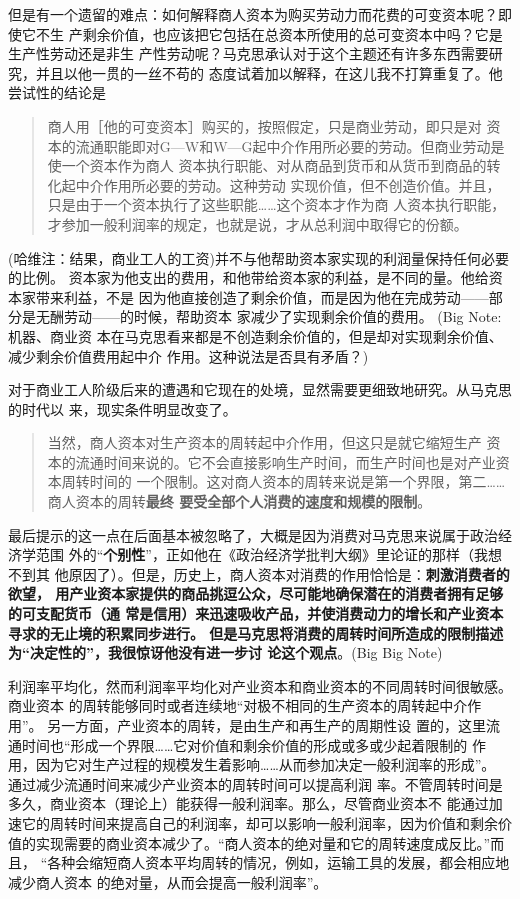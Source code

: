 但是有一个遗留的难点：如何解释商人资本为购买劳动力而花费的可变资本呢？即使它不生
产剩余价值，也应该把它包括在总资本所使用的总可变资本中吗？它是生产性劳动还是非生
产性劳动呢？马克思承认对于这个主题还有许多东西需要研究，并且以他一贯的一丝不苟的
态度试着加以解释，在这儿我不打算重复了。他尝试性的结论是

\begin{quotation}商人用［他的可变资本］购买的，按照假定，只是商业劳动，即只是对
资本的流通职能即对G—W和W—G起中介作用所必要的劳动。但商业劳动是使一个资本作为商人
资本执行职能、对从商品到货币和从货币到商品的转化起中介作用所必要的劳动。这种劳动
实现价值，但不创造价值。并且，只是由于一个资本执行了这些职能……这个资本才作为商
人资本执行职能，才参加一般利润率的规定，也就是说，才从总利润中取得它的份额。
\end{quotation}

(哈维注：结果，商业工人的工资)并不与他帮助资本家实现的利润量保持任何必要的比例。
资本家为他支出的费用，和他带给资本家的利益，是不同的量。他给资本家带来利益，不是
因为他直接创造了剩余价值，而是因为他在完成劳动——部分是无酬劳动——的时候，帮助资本
家减少了实现剩余价值的费用。 (Big Note: 机器、商业资
本在马克思看来都是不创造剩余价值的，但是却对实现剩余价值、减少剩余价值费用起中介
作用。这种说法是否具有矛盾？)

对于商业工人阶级后来的遭遇和它现在的处境，显然需要更细致地研究。从马克思的时代以
来，现实条件明显改变了。

\begin{quotation}当然，商人资本对生产资本的周转起中介作用，但这只是就它缩短生产
资本的流通时间来说的。它不会直接影响生产时间，而生产时间也是对产业资本周转时间的
一个限制。这对商人资本的周转来说是第一个界限，第二……商人资本的周转\textbf{最终
要受全部个人消费的速度和规模的限制}。
\end{quotation}

最后提示的这一点在后面基本被忽略了，大概是因为消费对马克思来说属于政治经济学范围
外的“\textbf{个别性}”，正如他在《政治经济学批判大纲》里论证的那样（我想不到其
他原因了）。但是，历史上，商人资本对消费的作用恰恰是：\textbf{刺激消费者的欲望，
用产业资本家提供的商品挑逗公众，尽可能地确保潜在的消费者拥有足够的可支配货币（通
常是信用）来迅速吸收产品，并使消费动力的增长和产业资本寻求的无止境的积累同步进行。
但是马克思将消费的周转时间所造成的限制描述为“决定性的”，我很惊讶他没有进一步讨
论这个观点}。(Big Big Note)

利润率平均化，然而利润率平均化对产业资本和商业资本的不同周转时间很敏感。商业资本
的周转能够同时或者连续地“对极不相同的生产资本的周转起中介作用”。
 另一方面，产业资本的周转，是由生产和再生产的周期性设
置的，这里流通时间也“形成一个界限……它对价值和剩余价值的形成或多或少起着限制的
作用，因为它对生产过程的规模发生着影响……从而参加决定一般利润率的形成”。
通过减少流通时间来减少产业资本的周转时间可以提高利润
率。不管周转时间是多久，商业资本（理论上）能获得一般利润率。那么，尽管商业资本不
能通过加速它的周转时间来提高自己的利润率，却可以影响一般利润率，因为价值和剩余价
值的实现需要的商业资本减少了。“商人资本的绝对量和它的周转速度成反比。”而且，
“各种会缩短商人资本平均周转的情况，例如，运输工具的发展，都会相应地减少商人资本
的绝对量，从而会提高一般利润率”。

